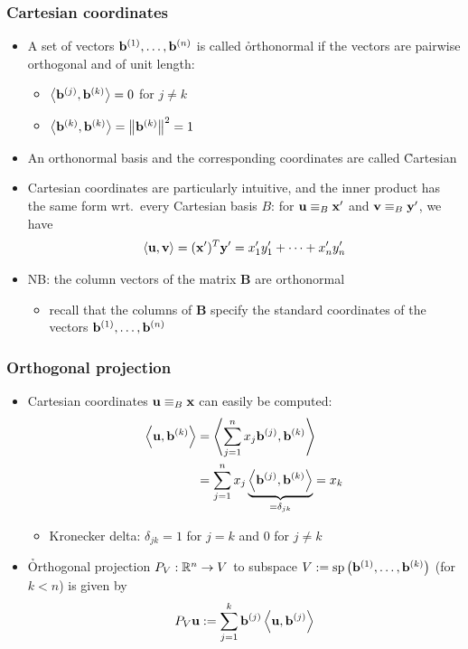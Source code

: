 \begin{frame}
  \frametitle{Cartesian coordinates}

  \begin{itemize}
  \item A set of vectors $\vb[1], \ldots, \vb[n]$ is called \h{orthonormal} if
    the vectors are pairwise orthogonal and of unit length:
    \begin{itemize}
    \item $\bigsprod{\vb[j]}{\vb[k]} = 0$ for $j\neq k$
    \item $\bigsprod{\vb[k]}{\vb[k]} = \bignorm{\vb[k]}^2 = 1$
    \end{itemize}
  \item An orthonormal basis and the corresponding coordinates are called
    \h{Cartesian}%
    \pause
  \item Cartesian coordinates are particularly intuitive, and the inner
    product has the same form wrt.\ every Cartesian basis $B$: for $\vu\equiv_B
    \vx'$ and $\vv\equiv_B \vy'$, we have
    \[ \sprod{\vu}{\vv} = (\vx')^T \vy' = x'_1 y'_1 + \dots + x'_n y'_n \]
  \item NB: the column vectors of the matrix $\mathbf{B}$ are orthonormal%
    \begin{itemize}
    \item recall that the columns of $\mathbf{B}$ specify the standard
      coordinates of the vectors $\vb[1], \ldots, \vb[n]$
    \end{itemize}
  \end{itemize}
\end{frame}

\begin{frame}
  \frametitle{Orthogonal projection} 
  
  \begin{itemize}
  \item Cartesian coordinates $\vu \equiv_B \vx$ can easily be computed:
    \begin{align*}
      \sprod{\vu}{\vb[k]} &= \sprod{\sum_{j=1}^n x_j \vb[j]}{\vb[k]} \\
      &= \sum_{j=1}^n x_j \underbrace{\sprod{\vb[j]}{\vb[k]}}_{= \delta_{jk}} 
      = x_k
    \end{align*}
    \begin{itemize}\ungap
    \item Kronecker delta: $\delta_{jk} = 1$ for $j=k$ and $0$ for $j\neq k$
    \end{itemize}
    \pause\gap
  \item \h{Orthogonal projection} $P_V:\mathbb{R}^n\to V$ to subspace $V
    \coloneq \Span{\vb[1], \ldots, \vb[k]}$ (for $k < n$) is given by
    \[
    P_V \vu \coloneq \sum_{j=1}^k \vb[j] \sprod{\vu}{\vb[j]}
    \]
  \end{itemize}
\end{frame}

